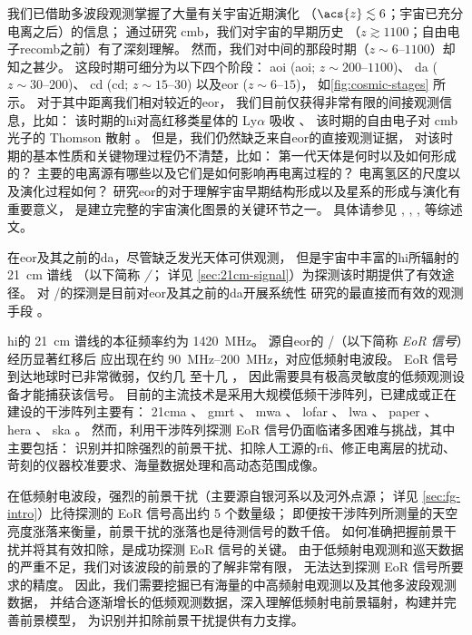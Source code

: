 我们已借助多波段观测掌握了大量有关宇宙近期演化
（$\acs{z} \lesssim 6$；宇宙已充分电离之后）的信息；
通过研究 \ac{cmb}，我们对宇宙的早期历史
（$z \gtrsim 1100$；自由电子\acl{recomb}之前）有了深刻理解。
然而，我们对中间的那段时期（$z \sim \numrange{6}{1100}$）却知之甚少。
这段时期可细分为以下四个阶段\cite{koopmans2015}：
\acl{aoi} (\acs{aoi}; $z \sim \numrange{200}{1100}$)、
\acl{da} ($z \sim \numrange{30}{200}$)、
\acl{cd} (\acs{cd}; $z \sim \numrange{15}{30}$)
以及\acl{eor} ($z \sim \numrange{6}{15}$)，
如\autoref{fig:cosmic-stages} 所示。
对于其中距离我们相对较近的\acl{eor}，
我们目前仅获得非常有限的间接观测信息，比如：
该时期的\ac{hi}对高红移类星体的 Ly$\alpha$ 吸收 \cite{becker2001}、
该时期的自由电子对 \ac{cmb} 光子的 Thomson 散射 \cite{kaplinghat2003}。
但是，我们仍然缺乏来自\acl{eor}的直接观测证据，
对该时期的基本性质和关键物理过程仍不清楚，比如：
第一代天体是何时以及如何形成的？
主要的电离源有哪些以及它们是如何影响再电离过程的？
电离氢区的尺度以及演化过程如何？
研究\acl{eor}的对于理解宇宙早期结构形成以及星系的形成与演化有重要意义，
是建立完整的宇宙演化图景的关键环节之一。
具体请参见 \textcite{fan2006}, \textcite{morales2010},
\textcite{pritchard2012}, \textcite{zaroubi2013} 等综述文。

在\acl{eor}及其之前的\acl{da}，尽管缺乏发光天体可供观测，
但是宇宙中丰富的\acl{hi}所辐射的 \SI{21}{\cm} 谱线
（以下简称 \emph{\hisignal/}；
详见 \autoref{sec:21cm-signal}）为探测该时期提供了有效途径。
对 \hisignal/的探测是目前对\acl{eor}及其之前的\acl{da}开展系统性
研究的最直接而有效的观测手段 \cite{koopmans2015,furlanetto2016}。

\acl{hi}的 \SI{21}{\cm} 谱线的本征频率约为 \SI{1420}{\MHz}。
源自\acl{eor}的 \hisignal/（以下简称 \emph{EoR 信号}）经历显著红移后
应出现在约 \SIrange{90}{200}{\MHz}，对应低频射电波段。
EoR 信号到达地球时已非常微弱，仅约几 \si{\mK} 至十几 \si{\mK}，
因此需要具有极高灵敏度的低频观测设备才能捕获该信号。
目前的主流技术是采用大规模低频干涉阵列，已建成或正在建设的干涉阵列主要有：
\ac{21cma} \cite{zheng2016}、
\ac{gmrt} \cite{paciga2011}、
\ac{mwa} \cite{bowman2013,tingay2013}、
\ac{lofar} \cite{vanHaarlem2013}、
\ac{lwa} \cite{ellingson2009}、
\ac{paper} \cite{parsons2010}、
\ac{hera} \cite{deboer2017}、
\ac{ska} \cite{mellema2013,koopmans2015}。
然而，利用干涉阵列探测 EoR 信号仍面临诸多困难与挑战，其中主要包括：
识别并扣除强烈的前景干扰、扣除人工源的\ac{rfi}、修正电离层的扰动、
苛刻的仪器校准要求、海量数据处理和高动态范围成像。

在低频射电波段，强烈的前景干扰（主要源自银河系以及河外点源；
详见 \autoref{sec:fg-intro}）比待探测的 EoR 信号高出约 5 个数量级；
即便按干涉阵列所测量的天空亮度涨落来衡量，前景干扰的涨落也是待测信号的数千倍。
如何准确把握前景干扰并将其有效扣除，是成功探测 EoR 信号的关键。
由于低频射电观测和巡天数据的严重不足，我们对该波段的前景的了解非常有限，
无法达到探测 EoR 信号所要求的精度。
因此，我们需要挖掘已有海量的中高频射电观测以及其他多波段观测数据，
并结合逐渐增长的低频观测数据，深入理解低频射电前景辐射，构建并完善前景模型，
为识别并扣除前景干扰提供有力支撑。

